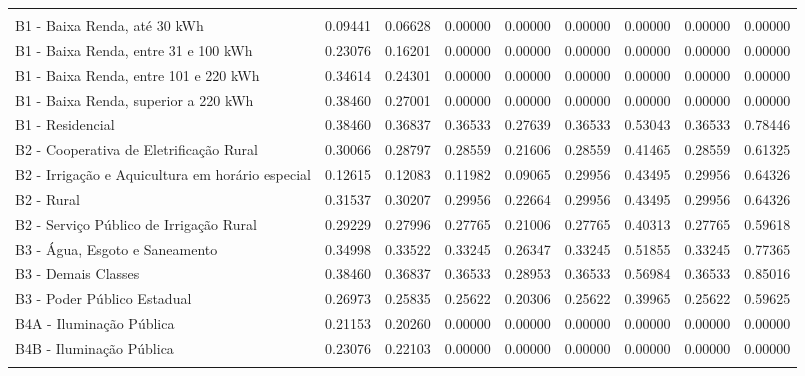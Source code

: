 \documentclass[grad,numbers]{coppe}
\begin{document}
\begin{longtable}[t]{>{\centering\arraybackslash}p{8em}cccccccc}
  \endfoot
  \bottomrule
  \multicolumn{9}{l}{\rule{0pt}{1em}\textit{Nota: } Consumo medido em R\$/kWh.}\\
  \endlastfoot
  B1 - Baixa Renda, até 30 kWh & 0.09441 & 0.06628 & 0.00000 & 0.00000 & 0.00000 & 0.00000 & 0.00000 & 0.00000\\
  B1 - Baixa Renda, entre 31 e 100 kWh & 0.23076 & 0.16201 & 0.00000 & 0.00000 & 0.00000 & 0.00000 & 0.00000 & 0.00000\\
  B1 - Baixa Renda, entre 101 e 220 kWh & 0.34614 & 0.24301 & 0.00000 & 0.00000 & 0.00000 & 0.00000 & 0.00000 & 0.00000\\
  B1 - Baixa Renda, superior a 220 kWh & 0.38460 & 0.27001 & 0.00000 & 0.00000 & 0.00000 & 0.00000 & 0.00000 & 0.00000\\
  B1 - Residencial & 0.38460 & 0.36837 & 0.36533 & 0.27639 & 0.36533 & 0.53043 & 0.36533 & 0.78446\\
  \addlinespace
  B2 - Cooperativa de Eletrificação Rural & 0.30066 & 0.28797 & 0.28559 & 0.21606 & 0.28559 & 0.41465 & 0.28559 & 0.61325\\
  B2 - Irrigação e Aquicultura em horário especial & 0.12615 & 0.12083 & 0.11982 & 0.09065 & 0.29956 & 0.43495 & 0.29956 & 0.64326\\
  B2 - Rural & 0.31537 & 0.30207 & 0.29956 & 0.22664 & 0.29956 & 0.43495 & 0.29956 & 0.64326\\
  B2 - Serviço Público de Irrigação Rural & 0.29229 & 0.27996 & 0.27765 & 0.21006 & 0.27765 & 0.40313 & 0.27765 & 0.59618\\
  B3 - Água, Esgoto e Saneamento & 0.34998 & 0.33522 & 0.33245 & 0.26347 & 0.33245 & 0.51855 & 0.33245 & 0.77365\\
  \addlinespace
  B3 - Demais Classes & 0.38460 & 0.36837 & 0.36533 & 0.28953 & 0.36533 & 0.56984 & 0.36533 & 0.85016\\
  B3 - Poder Público Estadual & 0.26973 & 0.25835 & 0.25622 & 0.20306 & 0.25622 & 0.39965 & 0.25622 & 0.59625\\
  B4A - Iluminação Pública & 0.21153 & 0.20260 & 0.00000 & 0.00000 & 0.00000 & 0.00000 & 0.00000 & 0.00000\\
  B4B - Iluminação Pública & 0.23076 & 0.22103 & 0.00000 & 0.00000 & 0.00000 & 0.00000 & 0.00000 & 0.00000\\*
  \end{longtable}
  \endgroup{}
\end{document}
